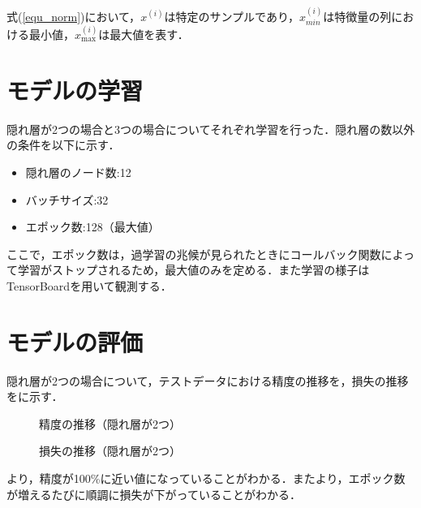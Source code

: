 \documentclass[a4j, 9pt, twocolumn, twoside]{jsarticle}
\begin{document}
	式(\ref{equ_norm})において，$x^{\left( i\right) }$は特定のサンプルであり，$x^{\left( i\right) }_{min}$は特徴量の列における最小値，$x^{\left( i\right) }_{\max}$は最大値を表す．\cite{python}

\section{モデルの学習}
	隠れ層が2つの場合と3つの場合についてそれぞれ学習を行った．隠れ層の数以外の条件を以下に示す．

	\begin{itemize}
		\item 隠れ層のノード数:12
		\item バッチサイズ:32
		\item エポック数:128（最大値）
	\end{itemize}

	ここで，エポック数は，過学習の兆候が見られたときにコールバック関数によって学習がストップされるため，最大値のみを定める．また学習の様子はTensorBoard\cite{tb}を用いて観測する．

\section{モデルの評価}
	隠れ層が2つの場合について，テストデータにおける精度の推移を，損失の推移をに示す．
	\begin{figure}
		\centering
		\caption{精度の推移（隠れ層が2つ）}
		\label{fig_hidden2_acc}
	\end{figure}
	\begin{figure}
		\centering
		\caption{損失の推移（隠れ層が2つ）}
		\label{fig_hidden2_loss}
	\end{figure}
	より，精度が100\%に近い値になっていることがわかる．またより，エポック数が増えるたびに順調に損失が下がっていることがわかる．
\end{document}
